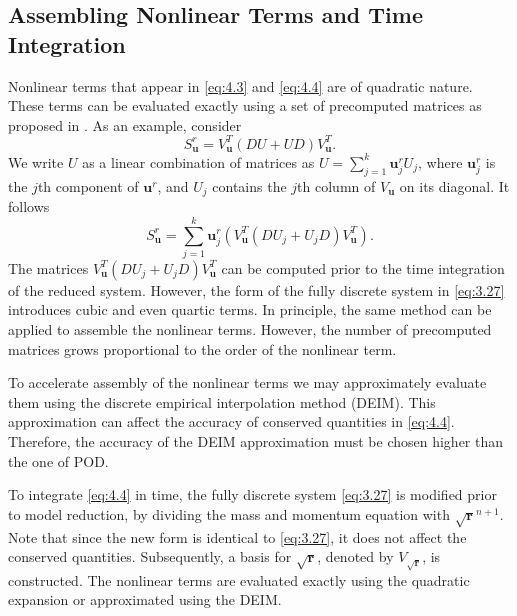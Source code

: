 \subsection{Assembling Nonlinear Terms and Time Integration}
Nonlinear terms that appear in \eqref{eq:4.3} and \eqref{eq:4.4} are of quadratic nature. These terms can be evaluated exactly using a set of precomputed matrices as proposed in \cite{Benner2018}. As an example, consider
\begin{equation}
	S_{\mathbf u}^r = V^T_{\mathbf u} ( DU + UD ) V^T_{\mathbf u}.
\end{equation}
We write $U$ as a linear combination of matrices as $U = \sum_{j=1}^k \mathbf u ^r_j U_j$, where $\mathbf u ^r_j$ is the $j$th component of $\mathbf u ^r$, and $U_j$ contains the $j$th column of $V_{\mathbf u}$ on its diagonal. It follows
\begin{equation}
	S_{\mathbf u}^r = \sum_{j=1}^k \mathbf u ^r_j \left( V^T_{\mathbf u} ( DU_j + U_jD ) V^T_{\mathbf u} \right).
\end{equation}
The matrices $V^T_{\mathbf u} ( DU_j + U_jD ) V^T_{\mathbf u}$ can be computed prior to the time integration of the reduced system. However, the form of the fully discrete system in \eqref{eq:3.27} introduces cubic and even quartic terms. In principle, the same method can be applied to assemble the nonlinear terms. However, the number of precomputed matrices grows proportional to the order of the nonlinear term. 

To accelerate assembly of the nonlinear terms we may approximately evaluate them using the discrete empirical interpolation method (DEIM). This approximation can affect the accuracy of conserved quantities in \eqref{eq:4.4}. Therefore, the accuracy of the DEIM approximation must be chosen higher than the one of POD.

To integrate \eqref{eq:4.4} in time, the fully discrete system \eqref{eq:3.27} is modified prior to model reduction, by dividing the mass and momentum equation with $\sqrt{\mathbf r}^{n+1}$. Note that since the new form is identical to \eqref{eq:3.27}, it does not affect the conserved quantities. Subsequently, a basis for $\sqrt{\mathbf r}$, denoted by $V_{\sqrt{\mathbf r}}$, is constructed.  The nonlinear terms are evaluated exactly using the quadratic expansion or approximated using the DEIM.
